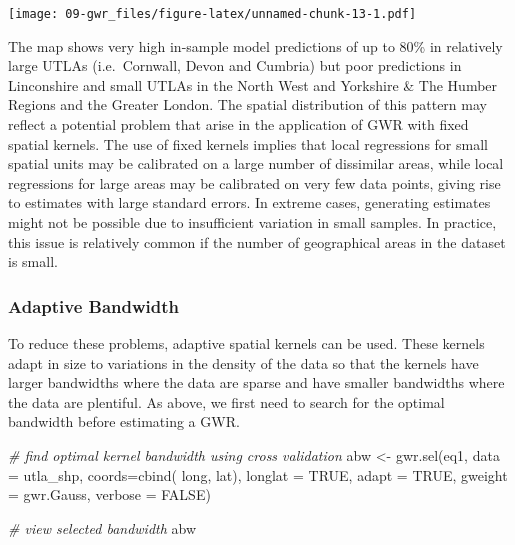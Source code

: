 \documentclass[
]{book}
\newenvironment{Shaded}{\begin{snugshade}}{\end{snugshade}}
\newcommand{\AttributeTok}[1]{\textcolor[rgb]{0.77,0.63,0.00}{#1}}
\newcommand{\CommentTok}[1]{\textcolor[rgb]{0.56,0.35,0.01}{\textit{#1}}}
\newcommand{\ConstantTok}[1]{\textcolor[rgb]{0.00,0.00,0.00}{#1}}
\newcommand{\FunctionTok}[1]{\textcolor[rgb]{0.00,0.00,0.00}{#1}}
\newcommand{\NormalTok}[1]{#1}
\newcommand{\OtherTok}[1]{\textcolor[rgb]{0.56,0.35,0.01}{#1}}
\begin{document}
\texttt{[image: 09-gwr\_files/figure-latex/unnamed-chunk-13-1.pdf]}

The map shows very high in-sample model predictions of up to 80\% in relatively large UTLAs (i.e.~Cornwall, Devon and Cumbria) but poor predictions in Linconshire and small UTLAs in the North West and Yorkshire \& The Humber Regions and the Greater London. The spatial distribution of this pattern may reflect a potential problem that arise in the application of GWR with fixed spatial kernels. The use of fixed kernels implies that local regressions for small spatial units may be calibrated on a large number of dissimilar areas, while local regressions for large areas may be calibrated on very few data points, giving rise to estimates with large standard errors. In extreme cases, generating estimates might not be possible due to insufficient variation in small samples. In practice, this issue is relatively common if the number of geographical areas in the dataset is small.

\hypertarget{adaptive-bandwidth}{%
\subsubsection{Adaptive Bandwidth}\label{adaptive-bandwidth}}

To reduce these problems, adaptive spatial kernels can be used. These kernels adapt in size to variations in the density of the data so that the kernels have larger bandwidths where the data are sparse and have smaller bandwidths where the data are plentiful. As above, we first need to search for the optimal bandwidth before estimating a GWR.

\begin{Shaded}
\begin{Highlighting}[]
\CommentTok{\# find optimal kernel bandwidth using cross validation}
\NormalTok{abw }\OtherTok{\textless{}{-}} \FunctionTok{gwr.sel}\NormalTok{(eq1, }
               \AttributeTok{data =}\NormalTok{ utla\_shp, }
               \AttributeTok{coords=}\FunctionTok{cbind}\NormalTok{( long, lat),}
               \AttributeTok{longlat =} \ConstantTok{TRUE}\NormalTok{,}
               \AttributeTok{adapt =} \ConstantTok{TRUE}\NormalTok{, }
               \AttributeTok{gweight =}\NormalTok{ gwr.Gauss, }
               \AttributeTok{verbose =} \ConstantTok{FALSE}\NormalTok{)}

\CommentTok{\# view selected bandwidth}
\NormalTok{abw}
\end{Highlighting}
\end{Shaded}
\end{document}
